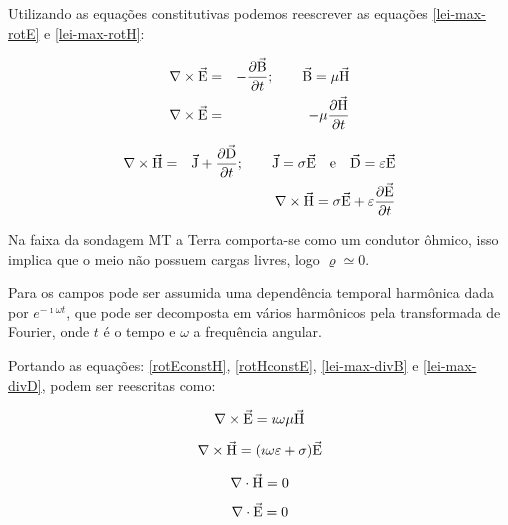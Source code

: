         Utilizando as equações constitutivas podemos reescrever as equações \ref{lei-max-rotE} e \ref{lei-max-rotH}:
        
        {\setlength\arraycolsep{2pt}
        \begin{eqnarray}
            \label{rotEconstH}
            \nabla \times \vec{\textrm{E}} &=& - \dfrac{\partial \vec{\textrm{B}}}{\partial t}; \qquad \vec{\textrm{B}} = \mu \vec{\textrm{H}} \nonumber \\
            \nabla \times \vec{\textrm{E}} &=& - \mu \dfrac{\partial \vec{\textrm{H}}}{\partial t}
        \end{eqnarray}}

        {\setlength\arraycolsep{2pt}
        \begin{eqnarray}
            \label{rotHconstE}
            \nabla \times \vec{\textrm{H}} &=& \vec{\textrm{J}} + \dfrac{\partial \vec{\textrm{D}}}{\partial t}; \qquad \vec{\textrm{J}} = \sigma \vec{\textrm{E}} \quad \textrm{e} \quad \vec{\textrm{D}} = \varepsilon \vec{\textrm{E}}\nonumber \\
            & &\nabla \times \vec{\textrm{H}} =  \sigma \vec{\textrm{E}} + \varepsilon \dfrac{\partial \vec{\textrm{E}}}{\partial t}
        \end{eqnarray}}
        
        Na faixa da sondagem MT a Terra comporta-se como um condutor ôhmico, isso implica que o meio não possuem cargas livres, logo $\varrho \simeq 0$. 
        
        Para os campos pode ser assumida uma dependência temporal harmônica dada por $e^{- \imath \omega t}$, que pode ser decomposta em vários harmônicos pela transformada de Fourier, onde $t$ é o tempo e $\omega$ a frequência angular. 
    
        Portando as equações: \ref{rotEconstH}, \ref{rotHconstE}, \ref{lei-max-divB} e \ref{lei-max-divD}, podem ser reescritas como:
        
        \begin{equation}
            \label{rotEconstHreescrito}
            \nabla \times \vec{\textrm{E}} = \imath \omega \mu \vec{\textrm{H}}           
        \end{equation}
        
        \begin{equation}
            \label{rotHconstEreescrito}
            \nabla \times \vec{\textrm{H}} = (\imath \omega \varepsilon + \sigma) \vec{\textrm{E}}
        \end{equation}
        
        \begin{equation}
            \nabla \cdot \vec{\textrm{H}}  = 0
        \end{equation}

        \begin{equation}
            \nabla \cdot \vec{\textrm{E}} = 0
        \end{equation}

